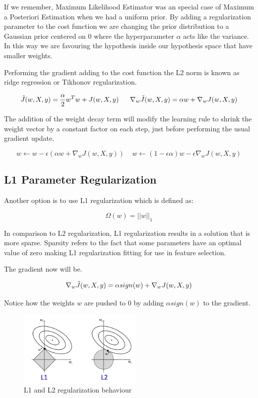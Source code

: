 \noindent If we remember, Maximum Likelihood Estimator was an special case of Maximum a Posteriori Estimation when we had a uniform prior. By adding a regularization parameter to the cost function we are changing the prior distribution to a Gaussian prior centered on 0 where the hyperparameter $\alpha$ acts like the variance. In this way we are favouring the hypothesis inside our hypothesis space that have smaller weights.

\newpage
\noindent Performing the gradient adding to the cost function the L2 norm is known as ridge regression or Tikhonov regularization. 

$$\Tilde{J} (w, X, y) = \frac{\alpha}{2} w^T w + J(w, X, y) ~~~~~ \nabla_w \Tilde{J} (w, X, y) = \alpha w + \nabla_w J (w, X, y)$$

\noindent The addition of the weight decay term will modify the learning rule to shrink the weight vector by a constant factor on each step, just before performing the usual gradient update.

$$ w \leftarrow w - \epsilon \left( \alpha w + \nabla_w J(w, X, y) \right) ~~~~~  w \leftarrow (1 - \epsilon \alpha) w - \epsilon \nabla_w J(w, X, y) $$

\subsection{L1 Parameter Regularization}

Another option is to use L1 regularization which is defined as:

$$ \Omega (w) = ||w||_1 $$

\noindent In comparison to L2 regularization, L1 regularization results in a solution that is more sparse. Sparsity refers to the fact that some parameters have an optimal value of zero making L1 regularization fitting for use in feature selection.

\noindent The gradient now will be.

$$ \nabla_w  \Tilde{J} (w, X, y) = \alpha sign(w) + \nabla_w J (w, X, y)$$

Notice how the weights $w$ are pushed to 0 by adding $\alpha sign(w)$ to the gradient.




\begin{figure}[h]
    \centering
    \includegraphics[width=6cm]{Plots/parameter_regularization.png}
    \caption{L1 and L2 regularization behaviour}
    \label{fig:parameter-regularization}
\end{figure}

